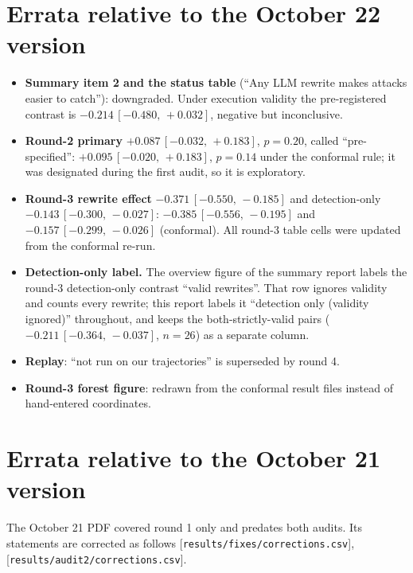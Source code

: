 \documentclass[11pt]{article}
\newcommand{\src}[1]{{\footnotesize\textcolor{ink2}{[\nolinkurl{#1}]}}}
\newcommand{\ci}[2]{\,[#1,\,#2]}
\begin{document}
\section{Errata relative to the October 22 version}
\begin{itemize}
\item \textbf{Summary item 2 and the status table} (``Any LLM rewrite makes attacks easier to catch''): downgraded. Under execution validity the pre-registered contrast is $-0.214\ci{-0.480}{+0.032}$, negative but inconclusive.
\item \textbf{Round-2 primary} $+0.087\ci{-0.032}{+0.183}$, $p=0.20$, called ``pre-specified'': $+0.095\ci{-0.020}{+0.183}$, $p=0.14$ under the conformal rule; it was designated during the first audit, so it is exploratory.
\item \textbf{Round-3 rewrite effect} $-0.371\ci{-0.550}{-0.185}$ and detection-only $-0.143\ci{-0.300}{-0.027}$: $-0.385\ci{-0.556}{-0.195}$ and $-0.157\ci{-0.299}{-0.026}$ (conformal). All round-3 table cells were updated from the conformal re-run.
\item \textbf{Detection-only label.} The overview figure of the summary report labels the round-3 detection-only contrast ``valid rewrites''. That row ignores validity and counts every rewrite; this report labels it ``detection only (validity ignored)'' throughout, and keeps the both-strictly-valid pairs ($-0.211\ci{-0.364}{-0.037}$, $n=26$) as a separate column.
\item \textbf{Replay}: ``not run on our trajectories'' is superseded by round 4.
\item \textbf{Round-3 forest figure}: redrawn from the conformal result files instead of hand-entered coordinates.
\end{itemize}

\section{Errata relative to the October 21 version}

The October 21 PDF covered round 1 only and predates both audits. Its statements are corrected as follows \src{results/fixes/corrections.csv}, \src{results/audit2/corrections.csv}.
\end{document}

